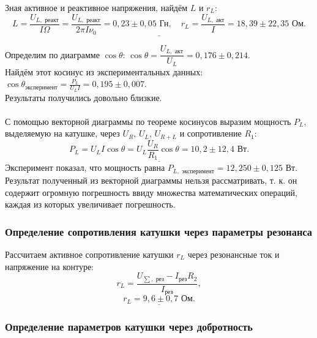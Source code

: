 \documentclass[a4paper,12pt]{article} %
\begin{document}
Зная активное и реактивное напряжения, найдём $ L $ и $ r_L $:
\begin{equation}\label{eq:14}
\underline{L = \frac{{{U_{L,\text{ реакт}}}}}{{I\Omega }} = \frac{{{U_{L,\text{ реакт}}}}}{{2\pi I{\nu _0}}} = 0,23 \pm 0,05 \text{ Гн}, \quad {r_L} = \frac{{{U_{L,\text{ акт}}}}}{I} = 18,39 \pm 22,35 \text{ Ом}.}
\end{equation}

Определим по диаграмме $ \cos \theta $: \underline{$\displaystyle \cos \theta = \dfrac{U_{L,\text{ акт}}}{U_{L}} = 0,176 \pm 0,214 $}.
\\
Найдём этот косинус из экспериментальных данных: \underline{$\displaystyle \cos {\theta_\text{эксперимент}} = \frac{{{P_L}}}{{{U_L}I}} = 0,195 \pm 0,007 $}.
\\
Результаты получились довольно близкие.
\\
\\
С помощью векторной диаграммы по теореме косинусов выразим мощность $ P_L $, выделяемую на катушке, через $ U_R $, $ U_L $, $ U_{R+L} $ и сопротивление $ R_1 $:
\begin{equation}\label{eq:15}
\underline{{P_L} = {U_L}I\cos \theta  = {U_L}\frac{{{U_R}}}{{{R_1}}}\cos \theta  = 10,2 \pm 12,4 \text{ Вт}.}
\end{equation}
Эксперимент показал, что мощность равна $ P_{L, \text{ эксперимент}} = 12,250 \pm 0,125 $ Вт. Результат полученный из векторной диаграммы нельзя рассматривать, т. к. он содержит огромную погрешность ввиду множества математических операций, каждая из которых увеличивает погрешность. 

\subsubsection{Определение сопротивления катушки через параметры резонанса}

Рассчитаем активное сопротивление катушки $ r_L $ через резонансные ток и напряжение на контуре:
\begin{equation}\label{eq:16}
{r_L} = \frac{{{U_{\sum ,\text{ рез}}} - {I_{\text{рез}}}{R_2}}}{{{I_{\text{рез}}}}}, 
\end{equation}
\begin{equation*}
\underline{r_L = 9,6 \pm 0,7 \text{ Ом}.}
\end{equation*}

\subsubsection{Определение параметров катушки через добротность}
\end{document}
